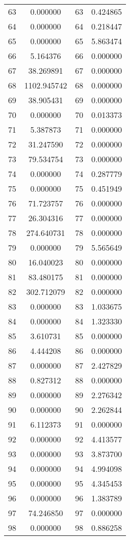 \documentclass[12pt]{article}
\begin{document}
\begin{longtable}{@{}cccc@{}}
63 & 0.000000 & 63 & 0.424865 \\
64 & 0.000000 & 64 & 0.218447 \\
65 & 0.000000 & 65 & 5.863474 \\
66 & 5.164376 & 66 & 0.000000 \\
67 & 38.269891 & 67 & 0.000000 \\
68 & 1102.945742 & 68 & 0.000000 \\
69 & 38.905431 & 69 & 0.000000 \\
70 & 0.000000 & 70 & 0.013373 \\
71 & 5.387873 & 71 & 0.000000 \\
72 & 31.247590 & 72 & 0.000000 \\
73 & 79.534754 & 73 & 0.000000 \\
74 & 0.000000 & 74 & 0.287779 \\
75 & 0.000000 & 75 & 0.451949 \\
76 & 71.723757 & 76 & 0.000000 \\
77 & 26.304316 & 77 & 0.000000 \\
78 & 274.640731 & 78 & 0.000000 \\
79 & 0.000000 & 79 & 5.565649 \\
80 & 16.040023 & 80 & 0.000000 \\
81 & 83.480175 & 81 & 0.000000 \\
82 & 302.712079 & 82 & 0.000000 \\
83 & 0.000000 & 83 & 1.033675 \\
84 & 0.000000 & 84 & 1.323330 \\
85 & 3.610731 & 85 & 0.000000 \\
86 & 4.444208 & 86 & 0.000000 \\
87 & 0.000000 & 87 & 2.427829 \\
88 & 0.827312 & 88 & 0.000000 \\
89 & 0.000000 & 89 & 2.276342 \\
90 & 0.000000 & 90 & 2.262844 \\
91 & 6.112373 & 91 & 0.000000 \\
92 & 0.000000 & 92 & 4.413577 \\
93 & 0.000000 & 93 & 3.873700 \\
94 & 0.000000 & 94 & 4.994098 \\
95 & 0.000000 & 95 & 4.345453 \\
96 & 0.000000 & 96 & 1.383789 \\
97 & 74.246850 & 97 & 0.000000 \\
98 & 0.000000 & 98 & 0.886258 \\

\end{longtable}
\end{document}
